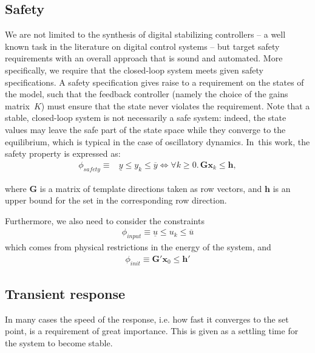 \documentclass[sigconf]{llncs}
\newcommand{\mat}[1]{\boldsymbol{#1}}
\renewcommand{\vec}[1]{\boldsymbol{#1}}
\begin{document}
\subsection{Safety} 
\label{ssec:safespecification}

We are not limited to the synthesis of digital stabilizing controllers -- a
well known task in the literature on digital control systems -- but target
safety requirements with an overall approach that is sound and automated. 
More specifically, we require that the closed-loop system meets given safety
specifications.  A safety specification gives raise to a requirement on the
states of the model, such that the feedback controller (namely the choice of
the gains matrix~$K$) must ensure that the state never violates the
requirement.  Note that a stable, closed-loop system is not necessarily a
safe system: indeed, the state values may leave the safe part of the state
space while they converge to the equilibrium, which is typical in the case
of oscillatory dynamics.  In~this work, the safety property is expressed as:
%
\begin{align}
\phi_\mathit{safety}\equiv& \underline{y} \leq y_k \leq \overline{y}
\iff \forall k\geq 0.\, \mat{G}\vec{x}_k \leq \vec{h},
\label{eq:safetyspec}
\end{align}

where $\mat{G}$ is a matrix of template directions taken as row vectors, and $\vec{h}$ is an upper
bound for the set in the corresponding row direction.

Furthermore, we also need to consider the 
constraints 
\begin{align}
\phi_\mathit{input}\equiv \underline{u} \leq u_k \leq \overline{u}
\label{eq:inputspec}
\end{align}
which comes from physical restrictions in the energy of the system, and
\begin{align}
\phi_\mathit{init}\equiv \mat{G}' \vec{x}_0 \leq \vec{h}'
\label{eq:initspec}
\end{align}

\subsection{Transient response} 
\label{ssec:transientspecification}
In many cases the speed of the response, i.e. how fast it converges to the set point, is a requirement of great importance. 
This is given as a settling time for the system to become stable.
 
\end{document}
